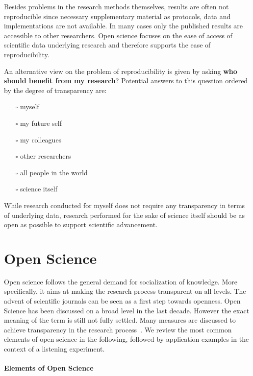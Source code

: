 \documentclass[a4paper, 10pt, twocolumn]{article}
\begin{document}
Besides problems in the research methods themselves, results are often not reproducible since 
necessary supplementary material as protocols, data and implementations are not available. In 
many cases only the published results are accessible to other researchers. Open science 
focuses on the ease of access of scientific data underlying research and therefore supports the ease of reproducibility.

An alternative view on the problem of reproducibility is given by asking 
\textbf{who should benefit from my research}? Potential answers to this question ordered by 
the degree of transparency are:
\begin{itemize}
\item[$\square$] myself
\item[$\square$] my future self
\item[$\square$] my colleagues
\item[$\square$] other researchers
\item[$\square$] all people in the world
\item[$\square$] science itself
\end{itemize}
While research conducted for myself does not require any transparency in terms
of underlying data, research performed for the sake of science itself should be
as open as possible to support scientific advancement.


\section*{Open Science} \label{sec:open_science} 

Open science follows the general demand for socialization of knowledge. More specifically, 
it aims at making the research process transparent on all levels. The advent of scientific 
journals can be seen as a first step towards openness. Open Science has been discussed on
a broad level in the last decade. However the exact meaning of the term is still not fully 
settled. Many measures are discussed to achieve transparency in the research process~\cite{Pontika15:ACM,Reproducibility15:AMS,Albagli15:Book,Vrana15:MIPRO,Kraker11:TEL}. 
We review the most common elements of open science in the following, followed by application 
examples in the context of a listening experiment.


\paragraph*{Elements of Open Science}
\end{document}
